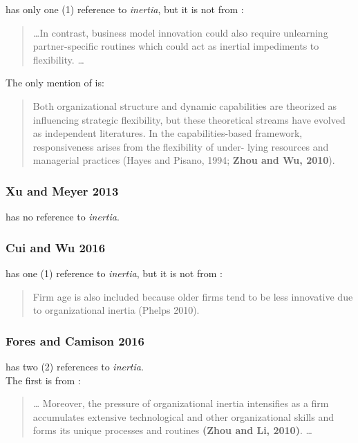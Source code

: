 \cite{bock2012effects} has only one (1) reference to \textit{inertia}, but it is not from \cite{zhou2010technological}: \\
\begin{quotation}
\ldots In contrast,
business model innovation could also require unlearning partner-specific routines which
could act as inertial impediments to flexibility. \ldots
\end{quotation}

The only mention of \cite{zhou2010technological} is: \\
\begin{quotation}
	Both organizational structure and dynamic capabilities are theorized as influencing
	strategic flexibility, but these theoretical streams have evolved as independent literatures.
	In the capabilities-based framework, responsiveness arises from the flexibility of under-
	lying resources and managerial practices (Hayes and Pisano, 1994; \textbf{Zhou and Wu, 2010}).\textellipsis
\end{quotation}

\subsubsection{Xu and Meyer 2013}

\cite{xu2013linking} has no reference to \textit{inertia}. \\

\subsubsection{Cui and Wu 2016}

\cite{cui2016utilizing} has one (1) reference to \textit{inertia}, but it is not from \cite{zhou2010technological}: \\
\begin{quotation}
Firm age is also included because older firms tend to be
less innovative due to organizational inertia (Phelps 2010).
\end{quotation}

\subsubsection{Fores and Camison 2016}

\cite{fores2016does} has two (2) references to \textit{inertia}.\\

The first is from \cite{zhou2010technological}:\\
\begin{quotation}
\ldots 
Moreover, the pressure of organizational inertia intensifies as a firm accumulates
extensive technological and other organizational skills and forms its unique processes and
routines \textbf{(Zhou and Li, 2010)}. \ldots
\end{quotation}

